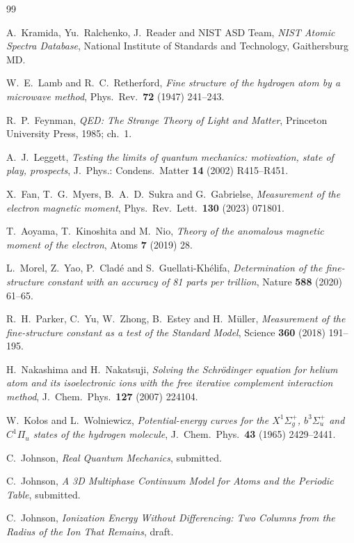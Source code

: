 \documentclass[11pt]{article}
\begin{document}
\begin{thebibliography}{99}

 A.~Kramida, Yu.~Ralchenko, J.~Reader and NIST ASD Team, \emph{NIST Atomic Spectra
Database}, National Institute of Standards and Technology, Gaithersburg MD.

 W.~E.~Lamb and R.~C.~Retherford, \emph{Fine structure of the hydrogen
atom by a microwave method}, Phys.\ Rev.\ \textbf{72} (1947) 241--243.

 R.~P.~Feynman, \emph{QED: The Strange Theory of Light and Matter},
Princeton University Press, 1985; ch.~1.

 A.~J.~Leggett, \emph{Testing the limits of quantum mechanics: motivation,
state of play, prospects}, J.~Phys.: Condens.\ Matter \textbf{14} (2002) R415--R451.

 X.~Fan, T.~G.~Myers, B.~A.~D.~Sukra and G.~Gabrielse, \emph{Measurement of the
electron magnetic moment}, Phys.\ Rev.\ Lett.\ \textbf{130} (2023) 071801.

 T.~Aoyama, T.~Kinoshita and M.~Nio, \emph{Theory of the anomalous magnetic
moment of the electron}, Atoms \textbf{7} (2019) 28.

 L.~Morel, Z.~Yao, P.~Clad\'e and S.~Guellati-Kh\'elifa, \emph{Determination of
the fine-structure constant with an accuracy of 81 parts per trillion}, Nature \textbf{588} (2020)
61--65.

 R.~H.~Parker, C.~Yu, W.~Zhong, B.~Estey and H.~M\"uller, \emph{Measurement of
the fine-structure constant as a test of the Standard Model}, Science \textbf{360} (2018) 191--195.

 H.~Nakashima and H.~Nakatsuji, \emph{Solving the Schr\"odinger equation
for helium atom and its isoelectronic ions with the free iterative complement interaction method},
J.\ Chem.\ Phys.\ \textbf{127} (2007) 224104.

 W.~Ko{\l}os and L.~Wolniewicz, \emph{Potential-energy curves for the
$X^1\Sigma_g^+$, $b^3\Sigma_u^+$ and $C^1\Pi_u$ states of the hydrogen molecule}, J.\ Chem.\ Phys.\
\textbf{43} (1965) 2429--2441.

 C.~Johnson, \emph{Real Quantum Mechanics}, submitted.

 C.~Johnson, \emph{A 3D Multiphase Continuum Model for Atoms and the
Periodic Table}, submitted.

 C.~Johnson, \emph{Ionization Energy Without Differencing: Two Columns
from the Radius of the Ion That Remains}, draft.

\end{thebibliography}
\end{document}
